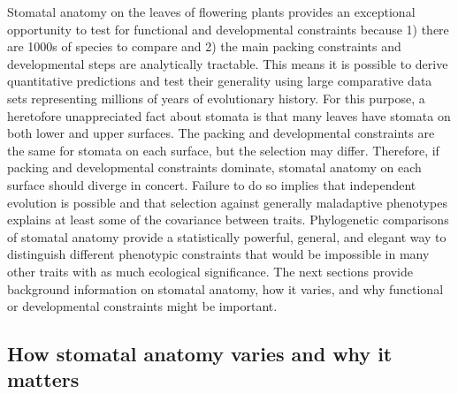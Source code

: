 \documentclass[
  12pt,
]{article}
\begin{document}
Stomatal anatomy on the leaves of flowering plants provides an exceptional opportunity to test for functional and developmental constraints because 1) there are 1000s of species to compare and 2) the main packing constraints and developmental steps are analytically tractable. This means it is possible to derive quantitative predictions and test their generality using large comparative data sets representing millions of years of evolutionary history. For this purpose, a heretofore unappreciated fact about stomata is that many leaves have stomata on both lower and upper surfaces. The packing and developmental constraints are the same for stomata on each surface, but the selection may differ. Therefore, if packing and developmental constraints dominate, stomatal anatomy on each surface should diverge in concert. Failure to do so implies that independent evolution is possible and that selection against generally maladaptive phenotypes explains at least some of the covariance between traits. Phylogenetic comparisons of stomatal anatomy provide a statistically powerful, general, and elegant way to distinguish different phenotypic constraints that would be impossible in many other traits with as much ecological significance. The next sections provide background information on stomatal anatomy, how it varies, and why functional or developmental constraints might be important.

\hypertarget{how-stomatal-anatomy-varies-and-why-it-matters}{%
\subsection{How stomatal anatomy varies and why it matters}\label{how-stomatal-anatomy-varies-and-why-it-matters}}
\end{document}
